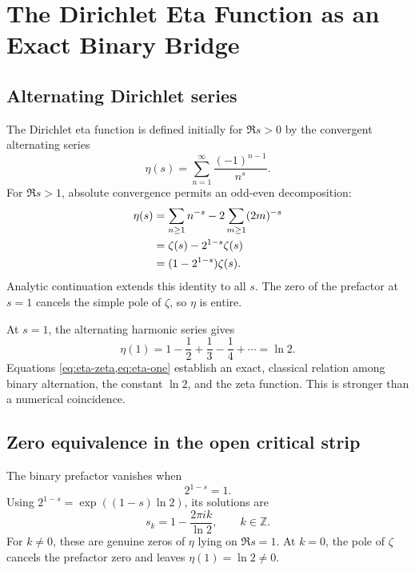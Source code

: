 \chapter{The Dirichlet Eta Function as an Exact Binary Bridge}
\label{chap:eta}

\section{Alternating Dirichlet series}

The Dirichlet eta function is defined initially for $\Re s>0$ by the convergent alternating series
\begin{equation}
 \eta(s)=\sum_{n=1}^{\infty}\frac{(-1)^{n-1}}{n^s}.
 \label{eq:eta-def}
\end{equation}
For $\Re s>1$, absolute convergence permits an odd-even decomposition:
\begin{align}
 \eta(s)
 &=\sum_{n\ge1}n^{-s}-2\sum_{m\ge1}(2m)^{-s}\notag\\
 &=\zeta(s)-2^{1-s}\zeta(s)\notag\\
 &=(1-2^{1-s})\zeta(s).
 \label{eq:eta-zeta}
\end{align}
Analytic continuation extends this identity to all $s$. The zero of the prefactor at $s=1$ cancels the simple pole of $\zeta$, so $\eta$ is entire.

At $s=1$, the alternating harmonic series gives
\begin{equation}
 \eta(1)=1-\frac12+\frac13-\frac14+\cdots=\ln2.
 \label{eq:eta-one}
\end{equation}
Equations \cref{eq:eta-zeta,eq:eta-one} establish an exact, classical relation among binary alternation, the constant $\ln2$, and the zeta function. This is stronger than a numerical coincidence.

\section{Zero equivalence in the open critical strip}

The binary prefactor vanishes when
\begin{equation}
 2^{1-s}=1.
 \label{eq:prefactor-zero-eq}
\end{equation}
Using $2^{1-s}=\exp((1-s)\ln2)$, its solutions are
\begin{equation}
 s_k=1-\frac{2\pi i k}{\ln2},\qquad k\in\mathbb Z.
 \label{eq:prefactor-zeros}
\end{equation}
For $k\neq0$, these are genuine zeros of $\eta$ lying on $\Re s=1$. At $k=0$, the pole of $\zeta$ cancels the prefactor zero and leaves $\eta(1)=\ln2\neq0$.

